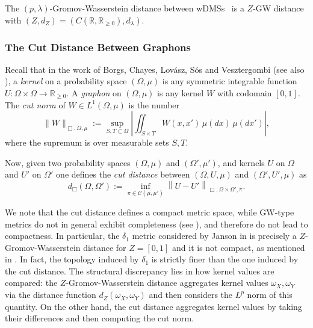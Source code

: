 \documentclass[twoside,11pt]{article}
\theoremstyle{definition}
\newcommand{\R}{\mathbb{R}}
\begin{document}
\begin{proposition}
    \label{prop:DMS}
    The $(p,\lambda)$-Gromov-Wasserstein distance between wDMSs~\citep{woojin-thesis} is a $Z$-GW distance with $(Z,d_Z) = (C(\R,\R_{\geq 0}),d_\lambda)$. 
\end{proposition}


\subsubsection{The Cut Distance Between Graphons}


Recall that in the work of Borgs, Chayes,
Lov\'asz, S\'os and Vesztergombi  \citep{borgs2008convergent} (see also \citealt{lovasz2012large,janson2010graphons}), a \emph{kernel} on a probability space $(\Omega,\mu)$ is any symmetric integrable function $U:\Omega\times \Omega\to\R_{\geq 0}$. A \emph{graphon} on $(\Omega,\mu)$ is any kernel $W$ with codomain $[0,1]$.
The \emph{cut norm} of $W\in L^1(\Omega,\mu)$ is the number
\[
\|W\|_{\Box,\Omega,\mu}:=\sup_{S,T\subset \Omega}\left|\iint_{S\times T}W(x,x')\,\mu(dx)\,\mu(dx')\right|,
\]
where the supremum is over measurable sets $S,T$.



Now, given two probability spaces $(\Omega,\mu)$ and $(\Omega',\mu')$, and kernels $U$ on $\Omega$ and $U'$ on $\Omega'$  one defines the \emph{cut distance} between $(\Omega,U,\mu)$ and $(\Omega',U',\mu)$ as \citep[Theorem 6.9]{janson2010graphons}
$$d_\Box(\Omega,\Omega'):=\inf_{\pi \in \mathcal{C}(\mu,\mu')}\left\|U-U'\right\|_{\Box,\Omega\times\Omega',\pi}.$$

We note that the cut distance defines a compact metric space, while GW-type metrics do not in general exhibit completeness (see \citealt[Remark 5.18]{memoli2011}), and therefore do not lead to compactness. In particular, the $\delta_1$ metric considered by Janson in \citep{janson2010graphons} is precisely a $Z$-Gromov-Wasserstein distance for $Z=[0,1]$ and it is not compact, as mentioned in \citet[p15]{janson2010graphons}. In fact, the topology induced by $\delta_1$ is strictly finer than the one induced by the cut distance. The structural discrepancy lies in how kernel values are compared: the $Z$-Gromov-Wasserstein distance aggregates  kernel values $\omega_X, \omega_Y$ via the distance function $d_Z(\omega_X,\omega_Y)$ and then considers the $L^p$ norm of this quantity. On the other hand, the cut distance aggregates kernel values by taking their differences and then computing the cut norm. 
\end{document}
